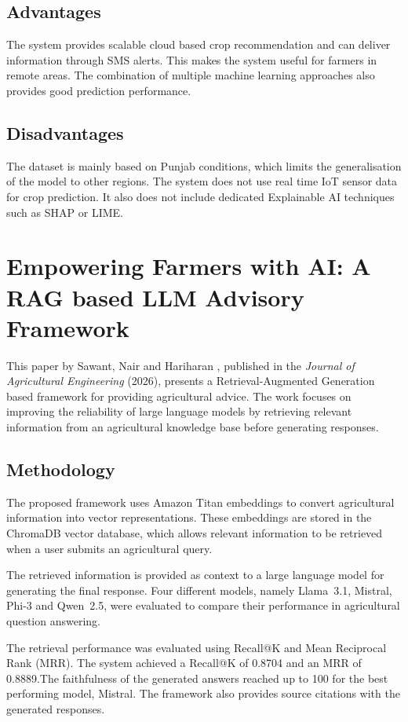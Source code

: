 \subsection{Advantages}

The system provides scalable cloud based crop recommendation and can deliver information through SMS alerts. This makes the system useful for farmers in remote areas. The combination of multiple machine learning approaches also provides good prediction performance.

\subsection{Disadvantages}

The dataset is mainly based on Punjab conditions, which limits the generalisation of the model to other regions. The system does not use real time IoT sensor data for crop prediction. It also does not include dedicated Explainable AI techniques such as SHAP or LIME.

\section{Empowering Farmers with AI: A RAG based LLM Advisory Framework}

This paper by Sawant, Nair and Hariharan , published in the \emph{Journal of Agricultural Engineering} (2026), presents a Retrieval-Augmented Generation based framework for providing agricultural advice. The work focuses on improving the reliability of large language models by retrieving relevant information from an agricultural knowledge base before generating responses.

\subsection{Methodology}

The proposed framework uses Amazon Titan embeddings to convert agricultural information into vector representations. These embeddings are stored in the ChromaDB vector database, which allows relevant information to be retrieved when a user submits an agricultural query.

The retrieved information is provided as context to a large language model for generating the final response. Four different models, namely Llama~3.1, Mistral, Phi-3 and Qwen~2.5, were evaluated to compare their performance in agricultural question answering.

The retrieval performance was evaluated using Recall@K and Mean Reciprocal Rank (MRR). The system achieved a Recall@K of 0.8704 and an MRR of 0.8889.\clearpage The faithfulness of the generated answers reached up to 100 for the best performing model, Mistral. The framework also provides source citations with the generated responses.

